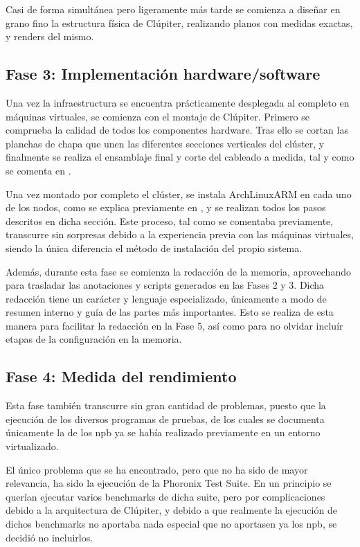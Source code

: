 Casi de forma simultánea pero ligeramente más tarde se comienza a diseñar en grano fino la estructura física de Clúpiter, realizando planos con medidas exactas, y renders del mismo.

\subsection{Fase 3: Implementación hardware/software}
Una vez la infraestructura se encuentra prácticamente desplegada al completo en máquinas virtuales, se comienza con el montaje de Clúpiter. Primero se comprueba la calidad de todos los componentes hardware. Tras ello se cortan las planchas de chapa que unen las diferentes secciones verticales del clúster, y finalmente se realiza el ensamblaje final y corte del cableado a medida, tal y como se comenta en .

Una vez montado por completo el clúster, se instala ArchLinuxARM en cada uno de los nodos, como se explica previamente en , y se realizan todos los pasos descritos en dicha sección. Este proceso, tal como se comentaba previamente, transcurre sin sorpresas debido a la experiencia previa con las máquinas virtuales, siendo la única diferencia el método de instalación del propio sistema.

Además, durante esta fase se comienza la redacción de la memoria, aprovechando para trasladar las anotaciones y scripts generados en las Fases 2 y 3. Dicha redacción tiene un carácter y lenguaje especializado, únicamente a modo de resumen interno y guía de las partes más importantes. Esto se realiza de esta manera para facilitar la redacción en la Fase 5, así como para no olvidar incluír etapas de la configuración en la memoria.

\subsection{Fase 4: Medida del rendimiento}
Esta fase también transcurre sin gran cantidad de problemas, puesto que la ejecución de los diversos programas de pruebas, de los cuales se documenta únicamente la de los \acrlong{npb} ya se había realizado previamente en un entorno virtualizado.

El único problema que se ha encontrado, pero que no ha sido de mayor relevancia, ha sido la ejecución de la Phoronix Test Suite. En un principio se querían ejecutar varios benchmarks de dicha suite, pero por complicaciones debido a la arquitectura de Clúpiter, y debido a que realmente la ejecución de dichos benchmarks no aportaba nada especial que no aportasen ya los \acrshort{npb}, se decidió no incluirlos. 

